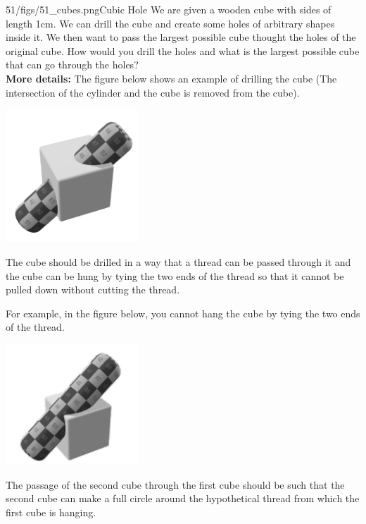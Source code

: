 \begin{problem}{51/figs/51_cubes.png}{Cubic Hole}  We are given a wooden cube with sides of length 1cm. We can drill the cube and create some holes of arbitrary shapes inside it. We then want to pass the largest possible cube thought the holes of the original cube. How would you drill the holes and what is the largest possible cube that can go through the holes?\\[0.2cm]
	
\textbf{More details:} 
The figure below shows an example of drilling the cube (The intersection of the cylinder and the cube is removed from the cube).
\begin{center}
	\includegraphics[width=5cm]{51/figs/51_1.png}
\end{center}
The cube should be drilled in a way that a thread can be passed through it and the cube can be hung by tying the two ends of the thread so that it cannot be pulled down without cutting the thread.

For example, in the figure below, you cannot hang the cube by tying the two ends of the thread.
\begin{center}
\includegraphics[width=5cm]{51/figs/51_2.png}
\end{center}

The passage of the second cube through the first cube should be such that the second cube can make a full circle around the hypothetical thread from which the first cube is hanging.
\end{problem}